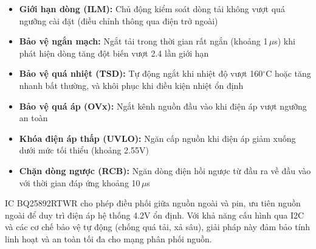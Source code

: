                     \begin{itemize}
                        \item \textbf{Giới hạn dòng (ILM):} Chủ động kiểm soát dòng tải không vượt quá ngưỡng cài đặt (điều chỉnh thông qua điện trở ngoài)
                        \item \textbf{Bảo vệ ngắn mạch:} Ngắt tải trong thời gian rất ngắn (khoảng 1\,$\mu$s) khi phát hiện dòng tăng đột biến vượt 2.4 lần giới hạn
                        \item \textbf{Bảo vệ quá nhiệt (TSD):} Tự động ngắt khi nhiệt độ vượt 160$^\circ$C hoặc tăng nhanh bất thường, và khôi phục khi điều kiện nhiệt ổn định
                        \item \textbf{Bảo vệ quá áp (OVx):} Ngắt kênh nguồn đầu vào khi điện áp vượt ngưỡng an toàn
                        \item \textbf{Khóa điện áp thấp (UVLO):} Ngăn cấp nguồn khi điện áp giảm xuống dưới mức tối thiểu (khoảng 2.55V)
                        \item \textbf{Chặn dòng ngược (RCB):} Ngăn dòng điện hồi ngược từ đầu ra về đầu vào với thời gian đáp ứng khoảng 10\,$\mu$s
                    \end{itemize}
                    

                    IC BQ25892RTWR cho phép điều phối giữa nguồn ngoài và pin, ưu tiên nguồn ngoài để duy trì điện áp hệ thống 4.2V ổn định. Với khả năng cấu hình qua I2C và các cơ chế bảo vệ tự động (chống quá tải, xả sâu), giải pháp này đảm bảo tính linh hoạt và an toàn tối đa cho mạng phân phối nguồn.

